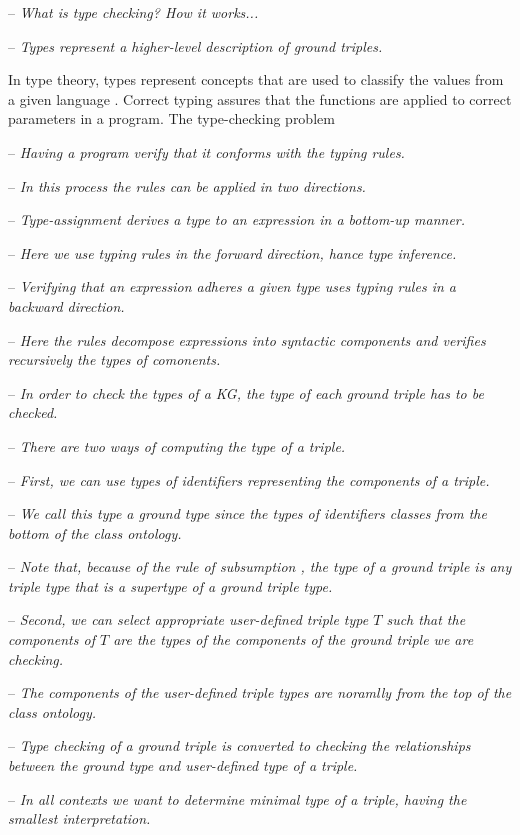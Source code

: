 \documentclass[runningheads]{llncs}
\newcommand{\notes}[1]{\noindent\begin{small}-- \emph{#1}\hfill\break\end{small}}
\newcommand{\nnotes}[1]{\indent\begin{small}-- \emph{#1}\hfill\break\end{small}}
\begin{document}
{%
\notes{What is type checking? How it works...}
\notes{Types represent a higher-level description of ground triples.}
In type theory, types represent concepts that are used to classify the
values from a given language \cite{Pierce2002,Hindley1997}. Correct
typing assures that the functions are applied to correct parameters in
a program. The type-checking problem \\
\nnotes{Having a program verify that it conforms with the typing rules.}
\nnotes{In this process the rules can be applied in two directions.}
\nnotes{Type-assignment derives a type to an expression in a bottom-up manner.}
\nnotes{Here we use typing rules in the forward direction, hance type inference.}
\nnotes{Verifying that an expression adheres a given type uses typing rules in a backward direction.}
\nnotes{Here the rules decompose expressions into syntactic components and verifies recursively the types of comonents.}

\notes{In order to check the types of a KG, the type of each ground triple has to be checked.}
\notes{There are two ways of computing the type of a triple.}
\notes{First, we can use types of identifiers representing the components of a triple.}
\nnotes{We call this type a \emph{ground type} since the types of identifiers classes from the bottom of the class ontology.}
\nnotes{Note that, because of the rule of subsumption \cite{Pierce2002}, the type of a ground triple is any triple type that is a supertype of a ground triple type.}
\notes{Second, we can select appropriate user-defined triple type $T$ such that the components of $T$ are the types of the components of the ground triple we are checking.}
\nnotes{The components of the user-defined triple types are noramlly from the top of the class ontology.}
\nnotes{Type checking of a ground triple is converted to checking the relationships between the ground type and user-defined type of a triple.} 
\notes{In all contexts we want to determine \emph{minimal type} of a triple, having the smallest interpretation.}}

  
\end{document}
